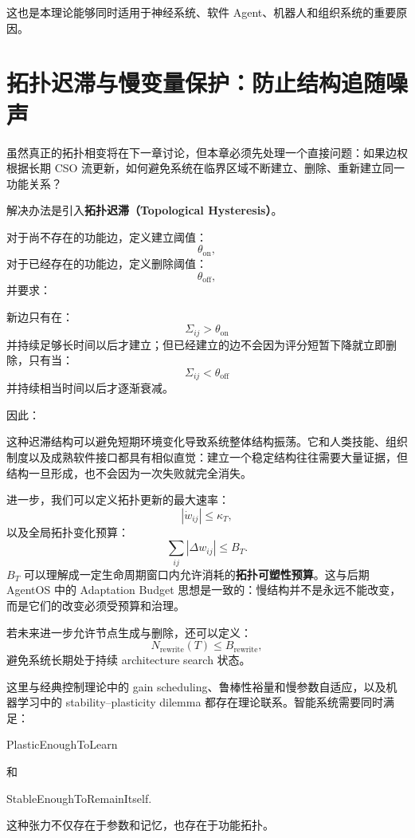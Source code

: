 这也是本理论能够同时适用于神经系统、软件 Agent、机器人和组织系统的重要原因。


\section{拓扑迟滞与慢变量保护：防止结构追随噪声}

虽然真正的拓扑相变将在下一章讨论，但本章必须先处理一个直接问题：如果边权根据长期 CSO 流更新，如何避免系统在临界区域不断建立、删除、重新建立同一功能关系？

解决办法是引入\textbf{拓扑迟滞（Topological Hysteresis）}。

对于尚不存在的功能边，定义建立阈值：
\[
\theta_{\mathrm{on}},
\]
对于已经存在的功能边，定义删除阈值：
\[
\theta_{\mathrm{off}},
\]
并要求：
\begin{statementbox}
\centering
{}
\end{statementbox}

新边只有在：
\[
\Sigma_{ij}>\theta_{\mathrm{on}}
\]
并持续足够长时间以后才建立；但已经建立的边不会因为评分短暂下降就立即删除，只有当：
\[
\Sigma_{ij}<\theta_{\mathrm{off}}
\]
并持续相当时间以后才逐渐衰减。

因此：
\begin{statementbox}
\centering
{}
\end{statementbox}

这种迟滞结构可以避免短期环境变化导致系统整体结构振荡。它和人类技能、组织制度以及成熟软件接口都具有相似直觉：建立一个稳定结构往往需要大量证据，但结构一旦形成，也不会因为一次失败就完全消失。

进一步，我们可以定义拓扑更新的最大速率：
\[
\left|
\dot w_{ij}
\right|
\leq
\kappa_T,
\]
以及全局拓扑变化预算：
\[
\sum_{ij}
\left|
\Delta w_{ij}
\right|
\leq
B_T.
\]
$B_T$ 可以理解成一定生命周期窗口内允许消耗的\textbf{拓扑可塑性预算}。这与后期 AgentOS 中的 Adaptation Budget 思想是一致的：慢结构并不是永远不能改变，而是它们的改变必须受预算和治理。

若未来进一步允许节点生成与删除，还可以定义：
\[
N_{\mathrm{rewrite}}
(T)
\leq
B_{\mathrm{rewrite}},
\]
避免系统长期处于持续 architecture search 状态。

这里与经典控制理论中的 gain scheduling、鲁棒性裕量和慢参数自适应，以及机器学习中的 stability--plasticity dilemma 都存在理论联系。智能系统需要同时满足：
\begin{statementbox}
PlasticEnoughToLearn
\end{statementbox}
和
\begin{statementbox}
StableEnoughToRemainItself.
\end{statementbox}
这种张力不仅存在于参数和记忆，也存在于功能拓扑。

